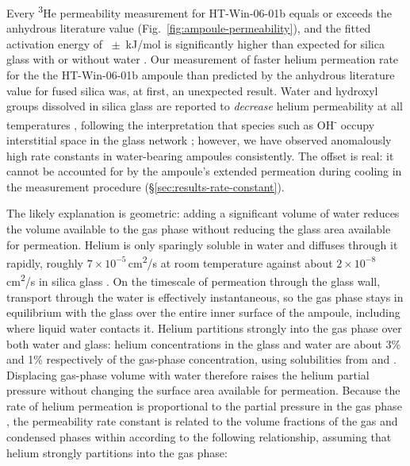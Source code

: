 Every \textsuperscript{3}He permeability measurement for HT-Win-06-01b equals or exceeds the anhydrous literature value (Fig.~\ref{fig:ampoule-permeability}), and the fitted activation energy of \ChTwoPermEakJ\ $\pm$ \ChTwoPermEaErrkJ\,kJ/mol is significantly higher than expected for silica glass with or without water \citep{swets1961,jones1953,masaryk1968,shelby1972}. Our measurement of faster helium permeation rate for the the HT-Win-06-01b ampoule than predicted by the anhydrous literature value for fused silica was, at first, an unexpected result. Water and hydroxyl groups dissolved in silica glass are reported to \emph{decrease} helium permeability at all temperatures \citep{tsuru2011,shelby1972,masaryk1968}, following the interpretation that species such as OH\textsuperscript{-} occupy interstitial space in the glass network \citep{norton1953,shackelford1999}; however, we have observed anomalously high rate constants in water-bearing ampoules consistently. The offset is real: it cannot be accounted for by the ampoule's extended permeation during cooling in the measurement procedure (\S\ref{sec:results-rate-constant}).

The likely explanation is geometric: adding a significant volume of water reduces the volume available to the gas phase without reducing the glass area available for permeation. Helium is only sparingly soluble in water and diffuses through it rapidly, roughly $7 \times 10^{-5}$\,cm\textsuperscript{2}/s at room temperature \citep{verhallen1984} against about $2 \times 10^{-8}$\,cm\textsuperscript{2}/s in silica glass \citep{swets1961}. On the timescale of permeation through the glass wall, transport through the water is effectively instantaneous, so the gas phase stays in equilibrium with the glass over the entire inner surface of the ampoule, including where liquid water contacts it. Helium partitions strongly into the gas phase over both water and glass: helium concentrations in the glass and water are about 3\% and 1\% respectively of the gas-phase concentration, using solubilities from \citet{sander2015} and \citet{swets1961}. Displacing gas-phase volume with water therefore raises the helium partial pressure without changing the surface area available for permeation. Because the rate of helium permeation is proportional to the partial pressure in the gas phase \citep{norton1953,altemose1961,swets1961,masaryk1968}, the permeability rate constant is related to the volume fractions of the gas and condensed phases within according to the following relationship, assuming that helium strongly partitions into the gas phase:

